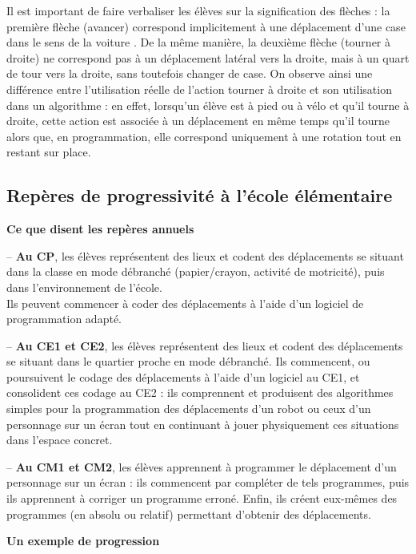 \smallskip
Il est important de faire verbaliser les élèves sur la signification des flèches : la première flèche (avancer) correspond implicitement à une déplacement d'une case \og dans le sens de la voiture \fg. De la même manière, la deuxième flèche (tourner à droite) ne correspond pas à un déplacement latéral vers la droite, mais à un quart de tour vers la droite, sans toutefois changer de case. On observe ainsi une différence entre l'utilisation réelle de l'action \og tourner à droite \fg{} et son utilisation dans un algorithme : en effet, lorsqu'un élève est à pied ou à vélo et qu'il tourne à droite, cette action est associée à un déplacement en même temps qu'il tourne alors que, en programmation, elle correspond uniquement à une rotation tout en restant sur place. \smallskip


\subsection{Repères de progressivité à l'école élémentaire} %

\smallskip

{\bf\large Ce que disent les repères annuels}

-- {\bf Au CP}, les élèves représentent des lieux et codent des déplacements se situant dans la classe en mode débranché (papier/crayon, activité de motricité), puis dans l’environnement de l’école. \\
   Ils peuvent commencer à coder des déplacements à l’aide d’un logiciel de programmation adapté.

-- {\bf Au CE1 et CE2}, les élèves représentent des lieux et codent des déplacements se situant dans le quartier proche en mode débranché. Ils commencent, ou poursuivent le codage des déplacements à l’aide d’un logiciel au CE1, et consolident ces codage au CE2 : ils comprennent et produisent des algorithmes simples pour la programmation des déplacements d’un robot ou ceux d’un personnage sur un écran tout en  continuant à jouer physiquement ces situations dans l’espace concret.
   
-- {\bf Au CM1 et CM2}, les élèves apprennent à programmer le déplacement d’un personnage sur un écran : ils commencent par compléter de tels programmes, puis ils apprennent à corriger un programme erroné. Enfin, ils créent eux-mêmes des programmes (en absolu ou relatif) permettant d’obtenir des déplacements.

\pagebreak


{\bf\large Un exemple de progression} %

